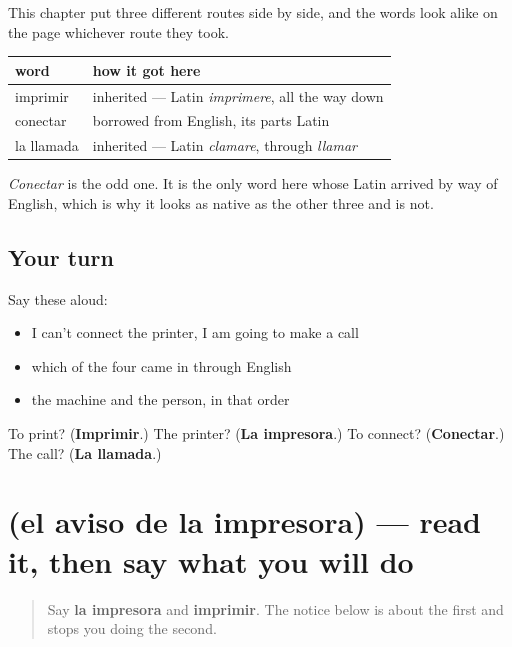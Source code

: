 \begin{cousinweb}
This chapter put three different routes side by side, and the words look alike on the page whichever route they took.

\noindent
\begin{tabularx}{\linewidth}{@{}>{\raggedright\arraybackslash}X>{\raggedright\arraybackslash}X@{}}
\toprule
\textbf{word} & \textbf{how it got here} \\
\midrule
imprimir & inherited — Latin \emph{imprimere}, all the way down \\
conectar & borrowed from English, its parts Latin \\
la llamada & inherited — Latin \emph{clamare}, through \emph{llamar} \\
\bottomrule
\end{tabularx}

\emph{Conectar} is the odd one. It is the only word here whose Latin arrived by way of English, which is why it looks as native as the other three and is not.
\end{cousinweb}

\subsection*{Your turn}
Say these aloud:

\begin{itemize}
\raggedright
  \item I can't connect the printer, I am going to make a call
  \item which of the four came in through English
  \item the machine and the person, in that order
\end{itemize}

\begin{tcolorbox}[breakable,colback=teal!4,colframe=teal!35!black,title={Before you move on}]
To print? (\textbf{Imprimir}.) The printer? (\textbf{La impresora}.) To connect? (\textbf{Conectar}.) The call? (\textbf{La llamada}.)
\end{tcolorbox}
\section[Practice]{(el aviso de la impresora) — read it, then say what you will do}

\label{lesson:ES-C469-sintesis-oficina}



\begin{quote}
Say \textbf{la impresora} and \textbf{imprimir}. The notice below is about the first and stops you doing the second.
\end{quote}

